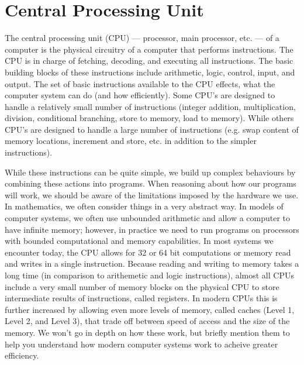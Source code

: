 \section {Central Processing Unit}

The central processing unit (CPU) --- processor, main processor, etc. --- of a computer is the physical
circuitry of a computer that performs instructions. The CPU is in charge of fetching, decoding, and
executing all instructions. The basic building blocks of these instructions include arithmetic, logic,
control, input, and output. The set of basic instructions available to the CPU effects, what the computer
system can do (and how efficiently). Some CPU's are designed to handle a relatively small number of
instructions (integer addition, multiplication, division, conditional branching, store to memory, load
to memory). While others CPU's are designed to handle a large number of instructions (e.g. swap content
of memory locations, increment and store, etc. in addition to the simpler instructions).

While these instructions can be quite simple, we build up complex behaviours by combining these actions
into programs. When reasoning about how our programs will work, we should be aware of the limitations
imposed by the hardware we use. In mathematics, we often consider things in a very abstract way. In models
of computer systems, we often use unbounded arithmetic and allow a computer to have infinite memory; however,
in practice we need to run programs on processors with bounded computational and memory capabilities. In most
systems we encounter today, the CPU allows for 32 or 64 bit computations or memory read and writes in a single
instruction. Because reading and writing to memory takes a long time (in comparison to arithemetic and logic
instructions), almost all CPUs include a very small number of memory blocks on the physical CPU to store
intermediate results of instructions, called registers. In modern CPUs this is further increased by allowing
even more levels of memory, called caches (Level 1, Level 2, and Level 3), that trade off between speed of access
and the size of the memory. We won't go in depth on how these work, but briefly mention them to help you
understand how modern computer systems work to acheive greater efficiency.
